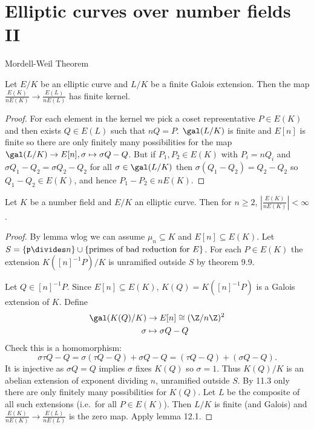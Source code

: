 \documentclass[a4paper]{article}
\theoremstyle{definition}
\begin{document}
\section{Elliptic curves over number fields II}

Mordell-Weil Theorem

\begin{lemma}
  Let \(E/K\) be an elliptic curve and \(L/K\) be a finite Galois extension. Then the map \(\frac{E(K)}{n E(K)} \to \frac{E(L)}{n E(L)}\) has finite kernel.
\end{lemma}

\begin{proof}
  For each element in the kernel we pick a coset representative \(P \in E(K)\) and then exists \(Q \in E(L)\) such that \(n Q = P\). \(\gal(L/K)\) is finite and \(E[n]\) is finite so there are only finitely many possibilities for the map \(\gal(L/K) \to E[n], \sigma \mapsto \sigma Q - Q\). But if \(P_1, P_2 \in E(K)\) with \(P_i = nQ_i\) and \(\sigma Q_1 - Q_2 = \sigma Q_2 - Q_2\) for all \(\sigma \in \gal(L/K)\) then \(\sigma(Q_1 - Q_2) = Q_2 - Q_2\) so \(Q_1 - Q_2 \in E(K)\), and hence \(P_1 - P_2 \in n E(K)\).
\end{proof}

\begin{theorem}
  Let \(K\) be a number field and \(E/K\) an elliptic curve. Then for \(n \geq 2\), \(|\frac{E(K)}{n E(K)}| < \infty\).
\end{theorem}

\begin{proof}
  By lemma wlog we can assume \(\mu_n \subseteq K\) and \(E[n] \subseteq E(K)\). Let \(S = \{\mathfrak p \divides n\} \cup \{\text{primes of bad reduction for } E\}\). For each \(P \in E(K)\) the extension \(K([n]^{-1}P)/K\) is unramified outside \(S\) by theorem 9.9.

  Let \(Q \in [n]^{-1}P\). Since \(E[n] \subseteq E(K)\), \(K(Q) = K([n]^{-1}P)\) is a Galois extension of \(K\). Define
  \begin{align*}
    \gal(K(Q)/K) &\to E[n] \cong (\Z/n\Z)^2 \\
    \sigma &\mapsto \sigma Q - Q
  \end{align*}
  Check this is a homomorphism:
  \[
    \sigma\tau Q - Q = \sigma(\tau Q - Q) + \sigma Q - Q = (\tau Q - Q) + (\sigma Q - Q).
  \]
  It is injective as \(\sigma Q = Q\) implies \(\sigma\) fixes \(K(Q)\) so \(\sigma = 1\). Thus \(K(Q)/K\) is an abelian extension of exponent dividing \(n\), unramified outside \(S\). By 11.3 only there are only finitely many possibilities for \(K(Q)\). Let \(L\) be the composite of all such extensions (i.e.\ for all \(P \in E(K)\)). Then \(L/K\) is finite (and Galois) and \(\frac{E(K)}{nE(K)} \to \frac{E(L)}{nE(L)}\) is the zero map. Apply lemma 12.1.
\end{proof}
\end{document}

